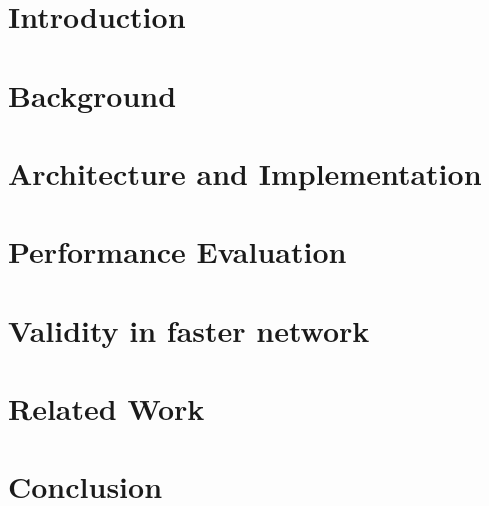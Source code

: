 
\graphicspath{{Manuscript/}}

\chapter{Introduction}


\chapter{Background}\label{chapter:Background}


\chapter{Architecture and Implementation}\label{chapter:Architecture and Implementation}



\chapter{Performance Evaluation}\label{chapter:Performance Evaluation}


\chapter{Validity in faster network}\label{chapter:Further Improvement}


\chapter{Related Work}\label{chapter:Related Work}


\chapter{Conclusion}\label{chapter:Conclusion and future work}


%



